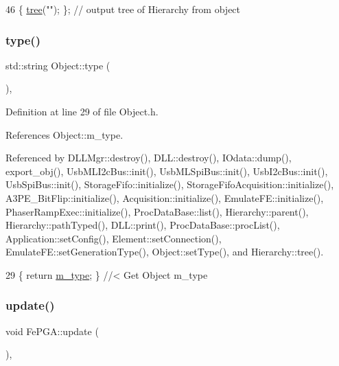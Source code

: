 \begin{DoxyCode}
46 \{ \hyperlink{classHierarchy_a594c294c5f60c230e106d522ed008212}{tree}(\textcolor{stringliteral}{""}); \};                     \textcolor{comment}{// output tree of Hierarchy from object}
\end{DoxyCode}
\mbox{\label{classObject_a84f99f70f144a83e1582d1d0f84e4e62}} 
\subsubsection{\texorpdfstring{type()}{type()}}
{\footnotesize\ttfamily std\+::string Object\+::type (\begin{DoxyParamCaption}{ }\end{DoxyParamCaption})\hspace{0.3cm}{\ttfamily [inline]}, {\ttfamily [inherited]}}



Definition at line 29 of file Object.\+h.



References Object\+::m\+\_\+type.



Referenced by D\+L\+L\+Mgr\+::destroy(), D\+L\+L\+::destroy(), I\+Odata\+::dump(), export\+\_\+obj(), Usb\+M\+L\+I2c\+Bus\+::init(), Usb\+M\+L\+Spi\+Bus\+::init(), Usb\+I2c\+Bus\+::init(), Usb\+Spi\+Bus\+::init(), Storage\+Fifo\+::initialize(), Storage\+Fifo\+Acquisition\+::initialize(), A3\+P\+E\+\_\+\+Bit\+Flip\+::initialize(), Acquisition\+::initialize(), Emulate\+F\+E\+::initialize(), Phaser\+Ramp\+Exec\+::initialize(), Proc\+Data\+Base\+::list(), Hierarchy\+::parent(), Hierarchy\+::path\+Typed(), D\+L\+L\+::print(), Proc\+Data\+Base\+::proc\+List(), Application\+::set\+Config(), Element\+::set\+Connection(), Emulate\+F\+E\+::set\+Generation\+Type(), Object\+::set\+Type(), and Hierarchy\+::tree().


\begin{DoxyCode}
29 \{ \textcolor{keywordflow}{return} \hyperlink{classObject_a457a600fe8c00eb1034374f75110a78c}{m\_type};       \} \textcolor{comment}{//< Get Object m\_type}
\end{DoxyCode}
\mbox{\label{classFePGA_ad23605ae261d2aa0562cbb732661b2c4}} 
\subsubsection{\texorpdfstring{update()}{update()}}
{\footnotesize\ttfamily void Fe\+P\+G\+A\+::update (\begin{DoxyParamCaption}{ }\end{DoxyParamCaption})\hspace{0.3cm}{\ttfamily [inline]}, {\ttfamily [virtual]}}

